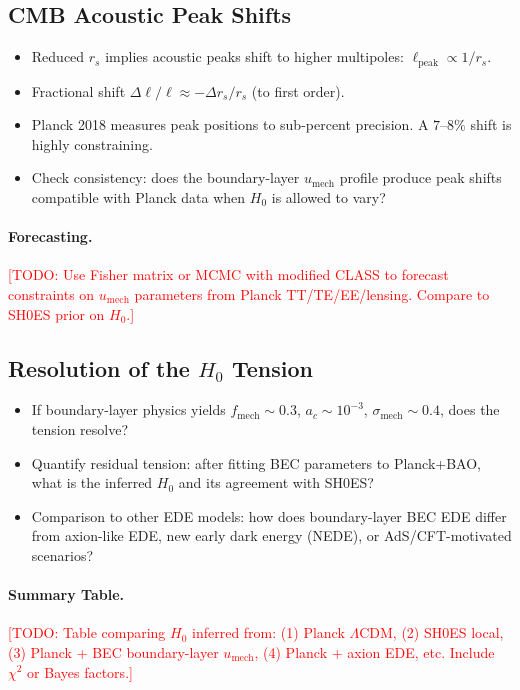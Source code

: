 \documentclass[11pt,a4paper]{article}
\newcommand{\umech}{\ensuremath{u_{\mathrm{mech}}}}
\newcommand{\fmech}{\ensuremath{f_{\mathrm{mech}}}}
\newcommand{\ac}{\ensuremath{a_c}}
\newcommand{\sigmamech}{\ensuremath{\sigma_{\mathrm{mech}}}}
\newcommand{\rs}{\ensuremath{r_s}}
\theoremstyle{definition}
\theoremstyle{remark}
\begin{document}
\subsection{CMB Acoustic Peak Shifts}
\label{sec:peak_shifts}

\begin{itemize}[leftmargin=*, itemsep=0.3em]
\item Reduced $\rs$ implies acoustic peaks shift to higher multipoles: $\ell_{\mathrm{peak}} \propto 1/\rs$.
\item Fractional shift $\Delta\ell/\ell \approx -\Delta\rs/\rs$ (to first order).
\item Planck 2018 measures peak positions to sub-percent precision. A $7$--$8\%$ shift is highly constraining.
\item Check consistency: does the boundary-layer $\umech$ profile produce peak shifts compatible with Planck data when $H_0$ is allowed to vary?
\end{itemize}

\paragraph{Forecasting.}
\textcolor{red}{[TODO: Use Fisher matrix or MCMC with modified CLASS to forecast constraints on $\umech$ parameters from Planck TT/TE/EE/lensing. Compare to SH0ES prior on $H_0$.]}

\subsection{Resolution of the $H_0$ Tension}
\label{sec:h0_resolution}

\begin{itemize}[leftmargin=*, itemsep=0.3em]
\item If boundary-layer physics yields $\fmech \sim 0.3$, $\ac \sim 10^{-3}$, $\sigmamech \sim 0.4$, does the tension resolve?
\item Quantify residual tension: after fitting BEC parameters to Planck+BAO, what is the inferred $H_0$ and its agreement with SH0ES?
\item Comparison to other EDE models: how does boundary-layer BEC EDE differ from axion-like EDE, new early dark energy (NEDE), or AdS/CFT-motivated scenarios?
\end{itemize}

\paragraph{Summary Table.}
\textcolor{red}{[TODO: Table comparing $H_0$ inferred from: (1) Planck $\Lambda$CDM, (2) SH0ES local, (3) Planck + BEC boundary-layer $\umech$, (4) Planck + axion EDE, etc. Include $\chi^2$ or Bayes factors.]}
\end{document}
